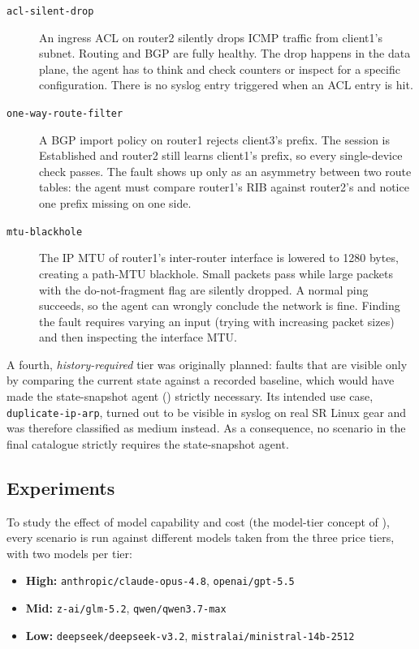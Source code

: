 \begin{description}
    \item[\texttt{acl-silent-drop}] An ingress ACL on router2 silently drops ICMP traffic
          from client1's subnet. Routing and BGP are fully healthy. The drop
          happens in the data plane, the agent has to think and check counters or inspect for a specific configuration.
          There is no syslog entry triggered when an ACL entry is hit.
    \item[\texttt{one-way-route-filter}] A BGP import policy on router1 rejects
          client3's prefix. The session is Established and router2 still
          learns client1's prefix, so every single-device check passes. The fault shows up only as an
          asymmetry between two route tables: the agent must compare router1's RIB
          against router2's and notice one prefix missing on one side.
    \item[\texttt{mtu-blackhole}] The IP MTU of router1's inter-router interface is
          lowered to 1280 bytes, creating a path-MTU blackhole. Small packets pass while large
          packets with the do-not-fragment flag are silently dropped. A normal ping
          succeeds, so the agent can wrongly conclude the network is fine. Finding the
          fault requires varying an input (trying with increasing packet sizes) and then
          inspecting the interface MTU.
\end{description}

A fourth, \emph{history-required} tier was originally planned: faults that are visible only
by comparing the current state against a recorded baseline, which would have made the
state-snapshot agent () strictly necessary. Its intended use case,
\texttt{duplicate-ip-arp}, turned out to be visible in syslog on real SR Linux gear and was
therefore classified as medium instead. As a consequence, no scenario in the final catalogue
strictly requires the state-snapshot agent.

\subsection{Experiments}
\label{sec:experiments}
To study the effect of model capability and cost (the model-tier concept of
), every scenario is run against different models taken from the three price
tiers, with two models per tier:

\begin{itemize}
    \item \textbf{High:} \texttt{anthropic/claude-opus-4.8}, \texttt{openai/gpt-5.5}
    \item \textbf{Mid:} \texttt{z-ai/glm-5.2}, \texttt{qwen/qwen3.7-max}
    \item \textbf{Low:} \texttt{deepseek/deepseek-v3.2}, \texttt{mistralai/ministral-14b-2512}
\end{itemize}

